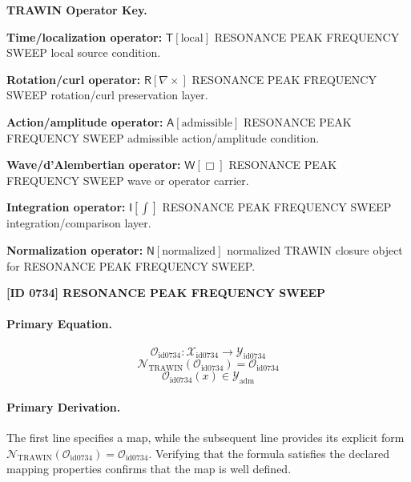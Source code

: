 \par\vspace{0.45\baselineskip}
\noindent\begin{minipage}[t]{\linewidth}
\begingroup
\small
\raggedright
\textbf{TRAWIN Operator Key.}\par
\noindent\textbf{Time/localization operator:} $\mathsf{T}\!\left[\mathrm{local}\right]$ RESONANCE PEAK FREQUENCY SWEEP local source condition.\par
\noindent\textbf{Rotation/curl operator:} $\mathsf{R}\!\left[\nabla\times\right]$ RESONANCE PEAK FREQUENCY SWEEP rotation/curl preservation layer.\par
\noindent\textbf{Action/amplitude operator:} $\mathsf{A}\!\left[\mathrm{admissible}\right]$ RESONANCE PEAK FREQUENCY SWEEP admissible action/amplitude condition.\par
\noindent\textbf{Wave/d'Alembertian operator:} $\mathsf{W}\!\left[\Box\right]$ RESONANCE PEAK FREQUENCY SWEEP wave or operator carrier.\par
\noindent\textbf{Integration operator:} $\mathsf{I}\!\left[\int\right]$ RESONANCE PEAK FREQUENCY SWEEP integration/comparison layer.\par
\noindent\textbf{Normalization operator:} $\mathsf{N}\!\left[\mathrm{normalized}\right]$ normalized TRAWIN closure object for RESONANCE PEAK FREQUENCY SWEEP.\par
\endgroup
\end{minipage}

\clearpage
\noindent\textbf{[ID 0734] RESONANCE PEAK FREQUENCY SWEEP}\par
\vspace{0.35em}
\paragraph{Primary Equation.}
\[
\mathcal{O}_{\mathrm{id0734}}:\mathcal{X}_{\mathrm{id0734}}\longrightarrow\mathcal{Y}_{\mathrm{id0734}}
\]
\[
\mathcal{N}_{\mathrm{TRAWIN}}(\mathcal{O}_{\mathrm{id0734}})=\mathcal{O}_{\mathrm{id0734}}
\]
\[
\mathcal{O}_{\mathrm{id0734}}(x)\in\mathcal{Y}_{\mathrm{adm}}
\]

\paragraph{Primary Derivation.}
The first line specifies a map, while the subsequent line provides its explicit form \( \mathcal{N}_{\mathrm{TRAWIN}}(\mathcal{O}_{\mathrm{id0734}})=\mathcal{O}_{\mathrm{id0734}} \). Verifying that the formula satisfies the declared mapping properties confirms that the map is well defined.
